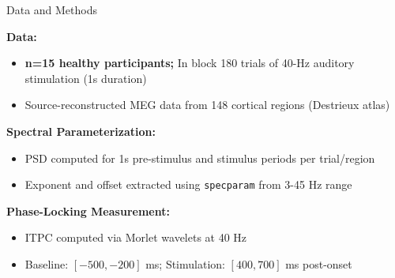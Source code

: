 \documentclass{beamer}
\newcommand{\mynum}[1]{\scalebox{1.075}{\firasemibold#1}}
\begin{document}
\begin{frame}[t]
\begin{textblock*}{\colwidth}




\begin{block}{ Data and Methods}
    \vspace{-0.333333\baselineskip}

	\textbf{Data:}
    \begin{itemize}
     \item \textbf{n=15 healthy participants;} In block 180 trials of 40-Hz auditory stimulation (1s duration) \citep{pellegrino2019}
        \item Source-reconstructed MEG data from 148 cortical regions (Destrieux atlas)
    \end{itemize}
    
    \textbf{Spectral Parameterization:}
    \begin{itemize}
        \item PSD computed for 1s pre-stimulus and stimulus periods per trial/region
        \item Exponent and offset extracted using \texttt{specparam} \citep{donoghue2020a} from 3-45 Hz range
    \end{itemize}
    
    \textbf{Phase-Locking Measurement:}
    \begin{itemize}
        \item ITPC computed via Morlet wavelets at 40 Hz \citep{pellegrino2019}
        \item Baseline: $[-500,-200]$ ms; Stimulation: $[400,700]$ ms post-onset
    \end{itemize}
    

\end{block}
\end{textblock*}
\end{frame}
\end{document}
